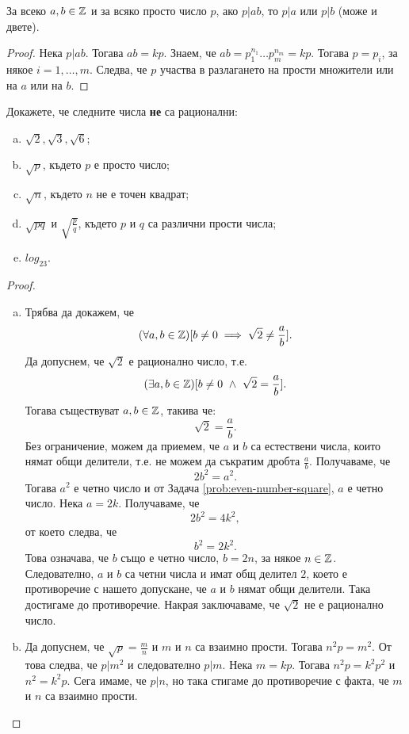\begin{problem}
  За всеко $a,b \in \mathbb{Z}$ и за всяко просто число $p$,
  ако $p\vert ab$, то $p\vert a$ или $p\vert b$ (може и двете).
\end{problem}
\begin{proof}
  Нека $p \vert ab$. Тогава $ab = kp$.
  Знаем, че $ab = p^{n_1}_1\dots p^{n_m}_m = kp$.
  Тогава $p = p_i$, за някое $i = 1,\dots,m$.
  Следва, че $p$ участва в разлагането на прости множители или на $a$ или на $b$.
\end{proof}

\begin{problem}
  Докажете, че следните числа {\bf не} са рационални:
  \begin{enumerate}[a)]
  \item
    $\sqrt{2},\sqrt{3},\sqrt{6}$;
  \item
    $\sqrt{p}$, където $p$ е просто число;
  \item
    $\sqrt{n}$, където $n$ не е точен квадрат;
  \item
    $\sqrt{pq}$ и $\sqrt{\frac{p}{q}}$, където $p$ и $q$ са различни прости числа;
  \item
    $log_23$.
  \end{enumerate}
\end{problem}
\begin{proof}
  \begin{enumerate}[a)]
  \item
    Трябва да докажем, че
    \[(\forall a,b \in \mathbb{Z})[b \neq 0 \implies \sqrt{2} \neq \frac{a}{b}].\]
    Да допуснем, че $\sqrt{2}$ е рационално число, т.е.
    \[(\exists a,b \in \mathbb{Z})[b \neq 0\ \wedge\ \sqrt{2} = \frac{a}{b}].\]
    Тогава  съществуват $a,b \in \mathbb{Z}$, такива че:
    \[\sqrt{2} = \frac{a}{b}.\]
    Без ограничение, можем да приемем, че $a$ и $b$ са естествени числа,
    които нямат общи делители, т.е. не можем да съкратим дробта $\frac{a}{b}$.
    Получаваме, че \[2b^2 = a^2.\]
    Тогава $a^2$ е четно число и от Задача \ref{prob:even-number-square}, $a$ е четно число.
    Нека $a = 2k$. Получаваме, че
    \[2b^2 = 4k^2,\]
    от което следва, че
    \[b^2 = 2k^2.\]
    Това означава, че $b$ също е четно число, $b = 2n$, за някое $n \in \mathbb{Z}$.
    Следователно, $a$ и $b$ са четни числа и имат общ делител $2$,
    което е противоречие с нашето допускане, че $a$ и $b$ нямат общи делители.
    Така достигаме до противоречие.
    Накрая заключаваме, че $\sqrt{2}$ не е рационално число.
  \item
    Да допуснем, че $\sqrt{p} = \frac{m}{n}$ и $m$ и $n$ са взаимно прости.
    Тогава $n^2p = m^2$. От това следва, че $p | m^2$ и следователно $p | m$.
    Нека $m = kp$. Тогава $n^2p = k^2p^2$ и $n^2 = k^2p$.
    Сега имаме, че $p | n$, но така стигаме до противоречие с факта, че $m$ и $n$
    са взаимно прости.
  \end{enumerate}
\end{proof}

